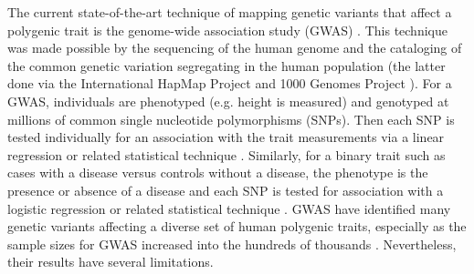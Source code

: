 The current state-of-the-art technique of mapping genetic variants
that affect a polygenic trait is the genome-wide association study
(GWAS) \citep{Hirschhorn2005}. This technique was made possible by the sequencing of the
human genome \citep{Lander2001, Venter2001, HGP2004, Lander2011} and the cataloging of the common genetic variation
segregating in the human population (the latter done via the
International HapMap Project \citep{HapMap2005, HapMap2007, HapMap2010} and 1000 Genomes Project \citep{1KG2010, 1KG2012}). For a GWAS, individuals are phenotyped
(e.g. height is measured) and genotyped at millions of common single
nucleotide polymorphisms (SNPs).  Then each SNP is tested individually
for an association with the trait measurements via a linear regression
or related statistical technique \citep{Balding2006, Yang2014}. Similarly, for a binary trait such
as cases with a disease versus controls without a disease, the
phenotype is the presence or absence of a disease and each SNP is
tested for association with a logistic regression or related
statistical technique \citep{Chang2015}. GWAS have identified many genetic variants
affecting a diverse set of human polygenic traits, especially as the
sample sizes for GWAS increased into the hundreds of
thousands \citep{Welter2014}. Nevertheless, their results have several limitations.

